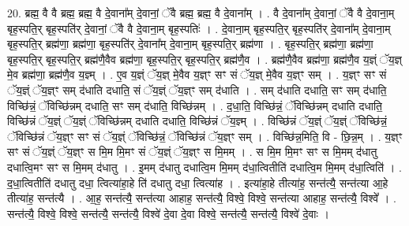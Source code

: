 \documentclass[17pt]{extarticle}
\begin{document}
20. ब्रह्म॒ वै वै ब्रह्म॒ ब्रह्म॒ वै दे॒वाना᳚म् दे॒वानां॒ ॅवै ब्रह्म॒ ब्रह्म॒ वै दे॒वाना᳚म् । . वै दे॒वाना᳚म् दे॒वानां॒ ॅवै वै दे॒वाना॒म् बृह॒स्पति॒र् बृह॒स्पति॑र् दे॒वानां॒ ॅवै वै दे॒वाना॒म् बृह॒स्पतिः॑ । . दे॒वाना॒म् बृह॒स्पति॒र् बृह॒स्पति॑र् दे॒वाना᳚म् दे॒वाना॒म् बृह॒स्पति॒र् ब्रह्म॑णा॒ ब्रह्म॑णा॒ बृह॒स्पति॑र् दे॒वाना᳚म् दे॒वाना॒म् बृह॒स्पति॒र् ब्रह्म॑णा । . बृह॒स्पति॒र् ब्रह्म॑णा॒ ब्रह्म॑णा॒ बृह॒स्पति॒र् बृह॒स्पति॒र् ब्रह्म॑णै॒वैव ब्रह्म॑णा॒ बृह॒स्पति॒र् बृह॒स्पति॒र् ब्रह्म॑णै॒व । . ब्रह्म॑णै॒वैव ब्रह्म॑णा॒ ब्रह्म॑णै॒व य॒ज्ञ्ं ॅय॒ज्ञ् मे॒व ब्रह्म॑णा॒ ब्रह्म॑णै॒व य॒ज्ञ्म् । . ए॒व य॒ज्ञ्ं ॅय॒ज्ञ् मे॒वैव य॒ज्ञ्ꣳ सꣳ सं ॅय॒ज्ञ् मे॒वैव य॒ज्ञ्ꣳ सम् । . य॒ज्ञ्ꣳ सꣳ सं ॅय॒ज्ञ्ं ॅय॒ज्ञ्ꣳ सम् द॑धाति दधाति॒ सं ॅय॒ज्ञ्ं ॅय॒ज्ञ्ꣳ सम् द॑धाति । . सम् द॑धाति दधाति॒ सꣳ सम् द॑धाति॒ विच्छि॑न्नं॒ ॅविच्छि॑न्नम् दधाति॒ सꣳ सम् द॑धाति॒ विच्छि॑न्नम् । . द॒धा॒ति॒ विच्छि॑न्नं॒ ॅविच्छि॑न्नम् दधाति दधाति॒ विच्छि॑न्नं ॅय॒ज्ञ्ं ॅय॒ज्ञ्ं ॅविच्छि॑न्नम् दधाति दधाति॒ विच्छि॑न्नं ॅय॒ज्ञ्म् । . विच्छि॑न्नं ॅय॒ज्ञ्ं ॅय॒ज्ञ्ं ॅविच्छि॑न्नं॒ ॅविच्छि॑न्नं ॅय॒ज्ञ्ꣳ सꣳ सं ॅय॒ज्ञ्ं ॅविच्छि॑न्नं॒ ॅविच्छि॑न्नं ॅय॒ज्ञ्ꣳ सम् । . विच्छि॑न्न॒मिति॒ वि - छि॒न्न॒म् । . य॒ज्ञ्ꣳ सꣳ सं ॅय॒ज्ञ्ं ॅय॒ज्ञ्ꣳ स मि॒म मि॒मꣳ सं ॅय॒ज्ञ्ं ॅय॒ज्ञ्ꣳ स मि॒मम् । . स मि॒म मि॒मꣳ सꣳ स मि॒मम् द॑धातु दधात्वि॒मꣳ सꣳ स मि॒मम् द॑धातु । . इ॒मम् द॑धातु दधात्वि॒म मि॒मम् द॑धा॒त्वितीति॑ दधात्वि॒म मि॒मम् द॑धा॒त्विति॑ । . द॒धा॒त्वितीति॑ दधातु दधा॒ त्वित्या॑हा॒हे ति॑ दधातु दधा॒ त्वित्या॑ह । . इत्या॑हा॒हे तीत्या॑ह॒ सन्त॑त्यै॒ सन्त॑त्या आ॒हे तीत्या॑ह॒ सन्त॑त्यै । . आ॒ह॒ सन्त॑त्यै॒ सन्त॑त्या आहाह॒ सन्त॑त्यै॒ विश्वे॒ विश्वे॒ सन्त॑त्या आहाह॒ सन्त॑त्यै॒ विश्वे᳚ । . सन्त॑त्यै॒ विश्वे॒ विश्वे॒ सन्त॑त्यै॒ सन्त॑त्यै॒ विश्वे॑ दे॒वा दे॒वा विश्वे॒ सन्त॑त्यै॒ सन्त॑त्यै॒ विश्वे॑ दे॒वाः । \newline
\end{document}
